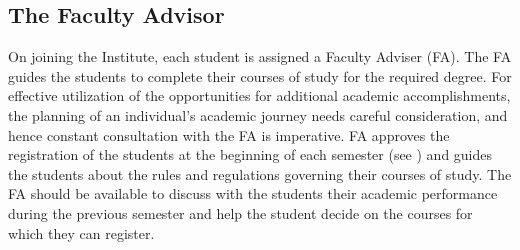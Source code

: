 \subsection{The Faculty Advisor \label{lab:Faculty Advisor}}

On joining the Institute, each student is assigned a Faculty Adviser (FA). The FA guides the \glspl{student} to complete their courses of study for the required degree. For effective utilization of the opportunities for additional academic accomplishments, the planning of an individual’s academic journey needs careful consideration, and hence constant consultation with the FA is imperative. FA approves the registration of the \glspl{student} at the beginning of each semester (see ) and guides the \glspl{student} about the rules and regulations governing their courses of study. The FA should be available to discuss with the \glspl{student} their academic performance during the previous semester and help the \gls{student} decide on the courses for which they can register.